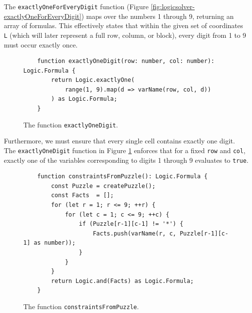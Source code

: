 The \texttt{exactlyOneForEveryDigit} function (Figure \ref{fig:logicsolver-exactlyOneForEveryDigit}) maps over
the numbers 1 through 9, returning an array of formulas. This effectively states that within the given set of
coordinates \texttt{L} (which will later represent a full row, column, or block), every digit from 1 to 9 must
occur exactly once. 

\begin{figure}[!ht]
  \centering
\begin{verbatim}
    function exactlyOneDigit(row: number, col: number): Logic.Formula {
        return Logic.exactlyOne(
            range(1, 9).map(d => varName(row, col, d))
        ) as Logic.Formula;
    }
\end{verbatim}
\vspace*{-0.3cm}
  \caption{The function \texttt{exactlyOneDigit}.}
  \label{fig:logicsolver-exactlyOneDigit}
\end{figure}

Furthermore, we must ensure that every single cell contains exactly one digit.  The \texttt{exactlyOneDigit}
function in Figure \ref{fig:logicsolver-exactlyOneDigit} enforces that for a fixed \texttt{row} and
\texttt{col}, exactly one of the variables corresponding to digits 1 through 9 evaluates to \texttt{true}. 



\begin{figure}[!ht]
  \centering
\begin{verbatim}
    function constraintsFromPuzzle(): Logic.Formula {
        const Puzzle = createPuzzle();
        const Facts  = [];
        for (let r = 1; r <= 9; ++r) { 
            for (let c = 1; c <= 9; ++c) {
                if (Puzzle[r-1][c-1] != '*') {
                    Facts.push(varName(r, c, Puzzle[r-1][c-1] as number));
                }
            }
        }
        return Logic.and(Facts) as Logic.Formula;
    }
\end{verbatim}
\vspace*{-0.3cm}
  \caption{The function \texttt{constraintsFromPuzzle}.}
  \label{fig:logicsolver-constraintsFromPuzzle}
\end{figure}

